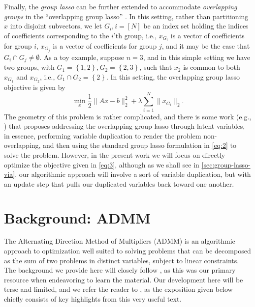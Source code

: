 \documentclass{article}
\begin{document}
Finally, the \emph{group lasso} can be further extended to accommodate \emph{overlapping groups} in the ``overlapping group lasso'' \cite{zhao_composite_2009,mairal_network_2010}.
In this setting, rather than partitioning $x$ into disjoint subvectors, we let $G_i, i = [N]$ be an index set holding the indices of coefficients corresponding to the $i$'th group, i.e., $x_{G_i}$ is a vector of coefficients for group $i$, $x_{G_j}$ is a vector of coefficients for group $j$, and it may be the case that $G_i \cap G_j \neq \emptyset$.
As a toy example, suppose $n=3$, and in this simple setting we have two groups, with $G_1 = \left\{ 1, 2 \right\}, G_2 = \left\{ 2, 3 \right\}$, such that $x_2$ is common to both $x_{G_1}$ and $x_{G_2}$, i.e., $G_1 \cap G_2 = \left\{ 2 \right\}$.
In this setting, the overlapping group lasso objective is given by
\begin{equation}
  \label{eq:3}
  \operatorname*{min}_x \frac{1}{2} \lVert Ax - b \rVert_2^2 + \lambda \sum_{i=1}^N \lVert x_{G_i} \rVert_2.
\end{equation}
The geometry of this problem is rather complicated, and there is some work (e.g., \cite{jacob_group_2009}) that proposes addressing the overlapping group lasso through latent variables, in essence, performing variable duplication to render the problem non-overlapping, and then using the standard group lasso formulation in \eqref{eq:2} to solve the problem.
However, in the present work we will focus on directly optimize the objective given in \eqref{eq:3}, although as we shall see in \ref{sec:group-lasso-via}, our algorithmic approach will involve a sort of variable duplication, but with an update step that pulls our duplicated variables back toward one another.

\section{Background: ADMM}
\label{sec:background:-admm}
The Alternating Direction Method of Multipliers (ADMM) is an algorithmic approach to optimization well suited to solving problems that can be decomposed as the sum of two problems in distinct variables, subject to linear constraints.
The background we provide here will closely follow \cite{boyd_distributed_2011}, as this was our primary resource when endeavoring to learn the material.
Our development here will be terse and limited, and we refer the reader to \cite{boyd_distributed_2011}, as the exposition given below chiefly consists of key highlights from this very useful text.
\end{document}

